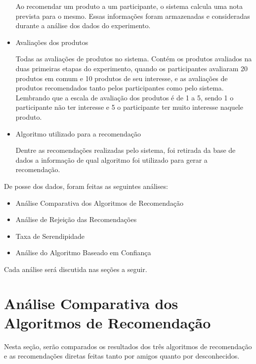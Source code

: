 \begin{itemize}
	\subitem Ao recomendar um produto a um participante, o sistema calcula uma nota prevista para o mesmo. Essas informações foram armazenadas e consideradas durante a análise dos dados do experimento.
	
	\item Avaliações dos produtos
	
	\subitem Todas as avaliações de produtos no sistema. Contém os produtos avaliados na duas primeiras etapas do experimento, quando os participantes avaliaram 20 produtos em comum e 10 produtos de seu interesse, e as avaliações de produtos recomendados tanto pelos participantes como pelo sistema.  Lembrando que a escala de avaliação dos produtos é de 1 a 5, sendo 1 o participante não ter interesse e 5 o participante ter muito interesse naquele produto.
	
	\item Algoritmo utilizado para a recomendação
	
	\subitem Dentre as recomendações realizadas pelo sistema, foi retirada da base de dados a informação de qual algoritmo foi utilizado para gerar a recomendação.
	
\end{itemize}

 De posse dos dados, foram feitas as seguintes análises:
 
\begin{itemize}
	\item Análise Comparativa dos Algoritmos de Recomendação
	\item Análise de Rejeição das Recomendações
	\item Taxa de Serendipidade
	\item Análise do Algoritmo Baseado em Confiança
\end{itemize}

 Cada análise será discutida nas seções a seguir.
 
\section{Análise Comparativa dos Algoritmos de Recomendação}
\label{sec:analise_comparativa_dos_algoritmos_de_recomendacao}

Nesta seção, serão comparados os resultados dos três algoritmos de recomendação e as recomendações diretas feitas tanto por amigos quanto por desconhecidos.

